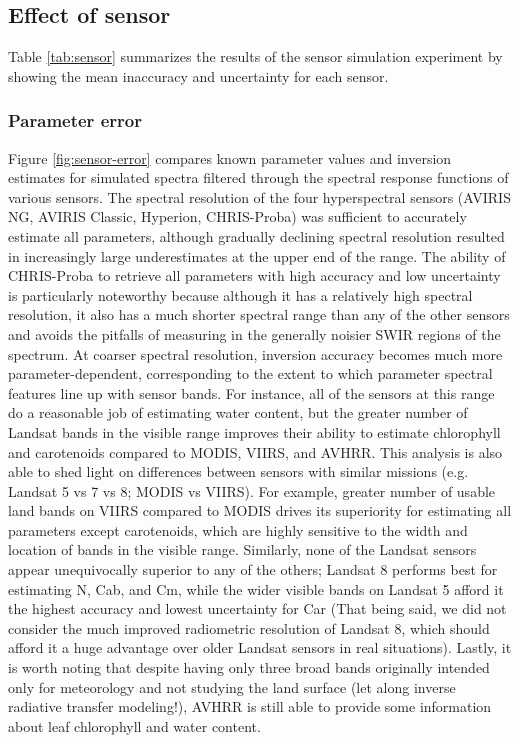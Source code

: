 {

\subsection{Effect of sensor}

Table \ref{tab:sensor} summarizes the results of the sensor simulation
experiment by showing the mean inaccuracy and uncertainty for each sensor.



\subsubsection{Parameter error}

Figure \ref{fig:sensor-error} compares known parameter values and inversion
estimates for simulated spectra filtered through the spectral response
functions of various sensors. The spectral resolution of the four
hyperspectral sensors (AVIRIS NG, AVIRIS Classic, Hyperion, CHRIS-Proba) was
sufficient to accurately estimate all parameters, although gradually declining
spectral resolution resulted in increasingly large underestimates at the upper
end of the range.  The ability of CHRIS-Proba to retrieve all parameters with
high accuracy and low uncertainty is particularly noteworthy because although
it has a relatively high spectral resolution, it also has a much shorter
spectral range than any of the other sensors and avoids the pitfalls of
measuring in the generally noisier SWIR regions of the spectrum.  At coarser
spectral resolution, inversion accuracy becomes much more parameter-dependent,
corresponding to the extent to which parameter spectral features line up with
sensor bands. For instance, all of the sensors at this range do a reasonable
job of estimating water content, but the greater number of Landsat bands in
the visible range improves their ability to estimate chlorophyll and
carotenoids compared to MODIS, VIIRS, and AVHRR. This analysis is also able to
shed light on differences between sensors with similar missions (e.g.  Landsat
5 vs 7 vs 8; MODIS vs VIIRS). For example, greater number of usable land bands
on VIIRS compared to MODIS drives its superiority for estimating all
parameters except carotenoids, which are highly sensitive to the width and
location of bands in the visible range. Similarly, none of the Landsat sensors
appear unequivocally superior to any of the others; Landsat 8 performs best
for estimating N, Cab, and Cm, while the wider visible bands on Landsat 5
afford it the highest accuracy and lowest uncertainty for Car (That being
said, we did not consider the much improved radiometric resolution of Landsat
8, which should afford it a huge advantage over older Landsat sensors in real
situations).  Lastly, it is worth noting that despite having only three broad
bands originally intended only for meteorology and not studying the land
surface (let along inverse radiative transfer modeling!), AVHRR is still able
to provide some information about leaf chlorophyll and water content.

}
